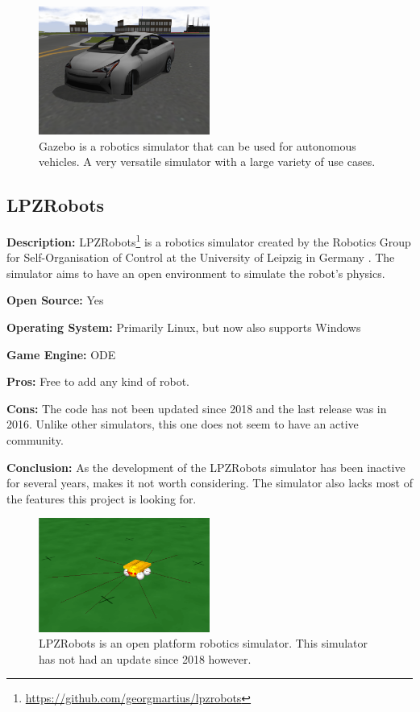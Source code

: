 \begin{figure}[H]
    \centering
    \includegraphics[width=0.5\textwidth]{03_Background/Appendix/Simulators/gazebo.png}
    \caption[Gazebo]{Gazebo is a robotics simulator that can be used for autonomous vehicles. A very versatile simulator with a large variety of use cases.}
\end{figure}


\subsection{LPZRobots}
\textbf{Description:} LPZRobots\footnote{\url{https://github.com/georgmartius/lpzrobots}} is a robotics simulator created by the Robotics Group for Self-Organisation of Control at the University of Leipzig in Germany \cite{LPZRobots_Website, LPZRobots_book}. The simulator aims to have an open environment to simulate the robot's physics. 

\textbf{Open Source:} Yes

\textbf{Operating System:} Primarily Linux, but now also supports Windows

\textbf{Game Engine:} ODE

\textbf{Pros:} Free to add any kind of robot.

\textbf{Cons:} The code has not been updated since 2018 and the last release was in 2016. Unlike other simulators, this one does not seem to have an active community. 

\textbf{Conclusion:} As the development of the LPZRobots simulator has been inactive for several years, makes it not worth considering. The simulator also lacks most of the features this project is looking for. 

\begin{figure}[H]
    \centering
    \includegraphics[width=0.5\textwidth]{03_Background/Appendix/Simulators/LPZRobots.png}
    \caption[LPZRobots]{LPZRobots is an open platform robotics simulator. This simulator has not had an update since 2018 however.}
\end{figure}


